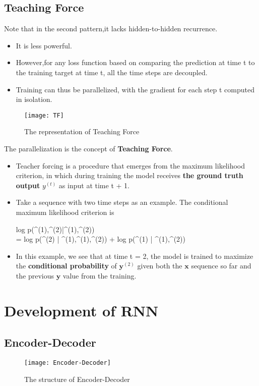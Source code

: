 	\subsection{Teaching Force}
		Note that in the second pattern,it lacks hidden-to-hidden
		recurrence.
		\begin{itemize}
			\item It is less powerful.
			\item However,for any loss function based on comparing the prediction at time t to the training target at time t, all the time steps are decoupled.
			\item Training can thus be parallelized, with the gradient for each step t computed in isolation.
		\end{itemize}
		\begin{figure}[H]
			\centering
			\texttt{[image: TF]}
			\caption{The representation of Teaching Force}
		\end{figure}
	The parallelization is the concept of \textbf{Teaching Force}.
		\begin{itemize}
			\item Teacher forcing is a procedure that emerges from the maximum likelihood criterion, in which during training the
			model receives \textbf{the ground truth output} $y^{(t)}$ as input at time t + 1.
			\item Take a sequence with two time steps as an example. The conditional maximum likelihood criterion is
			\begin{flalign*}
			log p(\mathbf{y}^{(1)},^{(2)}|\mathbf{x}^{(1)},^{(2)}) \\
			= log p(^{(2)} | ^{(1)},\mathbf{x}^{(1)},^{(2)}) + log p(^{(1)} | \mathbf{x}^{(1)},^{(2)})
			\end{flalign*}
			\item In this example, we see that at time t = 2, the model is trained to maximize the \textbf{conditional probability} of $\mathbf{y}^{(2)}$ given both the $$ sequence so far and the previous $\mathbf{y}$ value from the training.
		\end{itemize}	

	\section{Development of RNN}
	
	\subsection{Encoder-Decoder}
		\begin{figure}[H]
			\centering
			\texttt{[image: Encoder-Decoder]}
			\caption{The structure of Encoder-Decoder}
		\end{figure}

